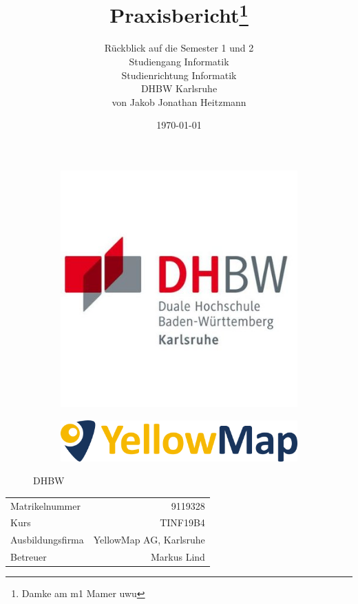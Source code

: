 \documentclass[12pt,a4paper]{article}
\title{Praxisbericht\thanks{Damke am m1 Mamer uwu}}
\author{R\"uckblick auf die Semester 1 und 2\\
	Studiengang Informatik\\
	Studienrichtung Informatik\\
	DHBW Karlsruhe\\
	von Jakob Jonathan Heitzmann
}
\date{\today}
\begin{document}

\begin{figure}[t!]
	\begin{subfigure}{0.4\linewidth}
		\includegraphics[scale=0.25]{DHBWKarlsruhe.jpg} 
	\end{subfigure}
	\hspace*{\fill}
	\begin{subfigure}{0.4\linewidth}
    	\includegraphics[scale=0.25]{YellowMap.png}
	\end{subfigure}
	\caption[https://www.aldi-sued.de/filialen/]{DHBW}
\end{figure}

\maketitle
\vspace*{\fill}


\begin{center}
	\begin{tabular}{p{8cm}r}
		Matrikelnummer & 9119328\\
		Kurs & TINF19B4\\
		Ausbildungsfirma & YellowMap AG, Karlsruhe\\
		Betreuer & Markus Lind
	\end{tabular}
\end{center}
\newpage
\end{document}
